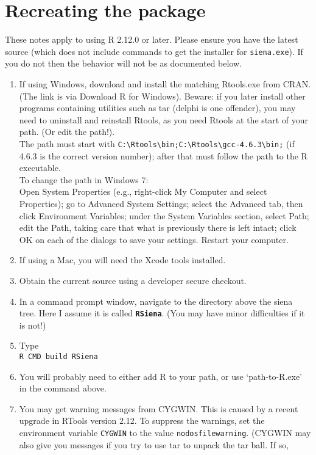 \documentclass[12pt, a4paper]{article}
\renewcommand{\=}{\,=\,}
\newcommand{\+}{\,+\,}
\newcommand{\sfn}[1]{\textbf{\texttt{#1}}}
\begin{document}
\section{Recreating the package}
These notes apply to using R 2.12.0 or later. Please ensure you have the
latest source (which does not include commands to get the installer for
\verb|siena.exe|). If you do not then the behavior will not be as documented
below.
\begin{enumerate}
\item If using Windows, download and install the matching
\textsf{Rtools.exe} from
  CRAN. (The link is via Download R for Windows). Beware: if you later install
  other programs containing utilities such as tar (delphi is one offender), you
  may need to uninstall and reinstall Rtools, as you need Rtools at the start of
  your path. (Or edit the path!).\\
  The path must start with 
  \verb|C:\Rtools\bin;C:\Rtools\gcc-4.6.3\bin;|
  (if 4.6.3 is the correct version number);
  after that must follow the path to the R executable.\\
  To change the path in Windows 7:\\
  Open System Properties (e.g., right-click My Computer and select Properties);
   go to Advanced System Settings;
    select the Advanced tab, then click Environment Variables;
    under the System Variables section, select Path;
    edit the Path, taking care that what is previously there is left intact;
    click OK on each of the dialogs to save your settings.
    Restart your computer.  
\item If using a Mac, you will need the Xcode tools installed.
\item Obtain the current source using a developer secure checkout.
\item In a command prompt window, navigate to the directory above the siena
  tree. Here I assume it is called \sfn{RSiena}. (You may have minor
  difficulties if it is not!)
\item Type\\
\verb|R CMD build RSiena|
\item You will probably need to either add R to your path, or use
  `path-to-R.exe' in the command above.
\item You may get warning messages from CYGWIN. This is caused by a recent
  upgrade in RTools version 2.12. To suppress the warnings, set the environment
  variable \verb|CYGWIN| to the value \verb|nodosfilewarning|. (CYGWIN may also
  give you messages if you try to use tar to unpack the tar ball. If so,

\end{enumerate}
\end{document}

